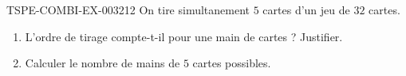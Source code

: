 \begin{exercice}{TSPE-COMBI-EX-003}{2}{12}
On tire simultanement $5$ cartes d'un jeu de $32$ cartes.
\begin{enumerate}
  \item L'ordre de tirage compte-t-il pour une main de cartes ? Justifier.
  \item Calculer le nombre de mains de $5$ cartes possibles.
\end{enumerate}
\end{exercice}
